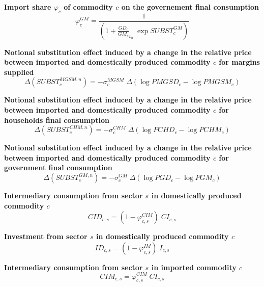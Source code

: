 \documentclass[12pt]{article}
\numberwithin{equation}{section}
\begin{document}
\noindent \textbf{Import share $\varphi_c$ of commodity $c$ on the governement final consumption} 
\begin{dmath}
\varphi^{GM}_{c} = \frac{1}{\left( 1 + \frac{GD_{c}}{GM_{c}}_{t_0} \; \operatorname{exp} SUBST^{GM}_{c} \right)}
\label{Trade_inter.mdlphi_GM[c]}
\end{dmath}

\noindent \textbf{Notional substitution effect induced by a change in the relative price between imported and domestically produced commodity $c$ for margins supplied} 
\begin{dmath}
\varDelta \left(SUBST^{MGSM,n}_{c}\right) = -\sigma^{MGSM}_{c} \; \varDelta \left(\operatorname{log} PMGSD_{c} - \operatorname{log} PMGSM_{c}\right)
\label{Trade_inter.mdlSUBST_MGSM_n[c]}
\end{dmath}

\noindent \textbf{Notional substitution effect induced by a change in the relative price between imported and domestically produced commodity $c$ for households final consumption} 
\begin{dmath}
\varDelta \left(SUBST^{CHM,n}_{c}\right) = -\sigma^{CHM}_{c} \; \varDelta \left(\operatorname{log} PCHD_{c} - \operatorname{log} PCHM_{c}\right)
\label{Trade_inter.mdlSUBST_CHM_n[c]}
\end{dmath}

\noindent \textbf{Notional substitution effect induced by a change in the relative price between imported and domestically produced commodity $c$ for government final consumption} 
\begin{dmath}
\varDelta \left(SUBST^{GM,n}_{c}\right) = -\sigma^{GM}_{c} \; \varDelta \left(\operatorname{log} PGD_{c} - \operatorname{log} PGM_{c}\right)
\label{Trade_inter.mdlSUBST_GM_n[c]}
\end{dmath}

\noindent \textbf{Intermediary consumption from sector $s$ in domestically produced commodity $c$} 
\begin{dmath}
CID_{c, s} = \left( 1 - \varphi^{CIM}_{c, s} \right) \; CI_{c, s}
\label{Trade_inter.mdlCID[c, s]}
\end{dmath}

\noindent \textbf{Investment from sector $s$ in domestically produced commodity $c$} 
\begin{dmath}
ID_{c, s} = \left( 1 - \varphi^{IM}_{c, s} \right) \; I_{c, s}
\label{Trade_inter.mdlID[c, s]}
\end{dmath}

\noindent \textbf{Intermediary consumption from sector $s$ in imported commodity $c$} 
\begin{dmath}
CIM_{c, s} = \varphi^{CIM}_{c, s} \; CI_{c, s}
\label{Trade_inter.mdlCIM[c, s]}
\end{dmath}
\end{document}
